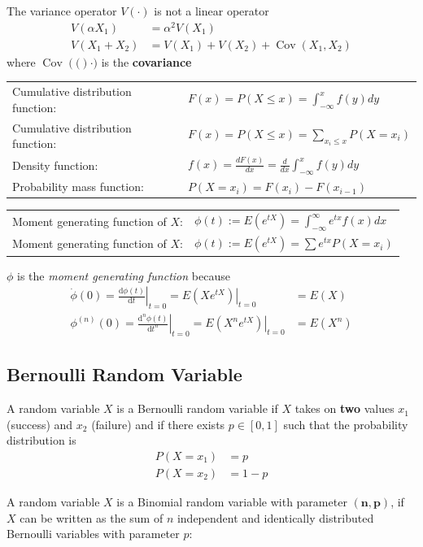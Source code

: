 \documentclass[11pt]{article}
\theoremstyle{definition}
\newcommand*\Cov[1]{\mathop{\text{Cov}}\left(#1\right)}
\begin{document}
The variance operator $V(\cdot)$ is not a linear operator
\begin{align*}
	V(\alpha X_1) &= \alpha^2 V(X_1)\\
	V(X_1 + X_2) &= V(X_1) + V(X_2) + \Cov{X_1,X_2}
\end{align*}
where $\Cov(\cdot)$ is the \textbf{covariance}

\begin{tabularx}{\linewidth}{lX}
	Cumulative distribution function: & $ F(x) = P(X\leq x) = \int_{-\infty}^{x}f(y)dy$\\
	Cumulative distribution function: & $ F(x) = P(X\leq x) = \sum_{x_i \leq x} P(X=x_i)$\\
	Density function: & $ f(x) = \frac{dF(x)}{dx} = \frac{d}{dx}\int_{-\infty}^{x}f(y)dy$\\
	Probability mass function: & $ P(X = x_i) = F(x_i) - F(x_{i-1})$\\
\end{tabularx}

\begin{tabularx}{\linewidth}{lX}
	Moment generating function of $X$: & $ \phi(t) := E(e^{tX}) = \int_{-\infty}^{\infty} e^{tx}f(x) dx$\\
	Moment generating function of $X$: & $ \phi(t) := E(e^{tX}) = \sum e^{tx}P(X=x_i)$
\end{tabularx}

$\phi$ is the \emph{moment generating function} because
\begin{align*}
	\dot{\phi}(0) = \left.\frac{\text{d}\phi(t)}{\text{d}t}\right|_{t=0} = \left. E(X e^{tX})\right|_{t=0} &= E(X)\\
	\phi^{(n)}(0) = \left.\frac{\text{d}^n\phi(t)}{\text{d}t^n}\right|_{t=0} = \left. E(X^n e^{tX})\right|_{t=0} &= E(X^n)
\end{align*}

\subsection{Bernoulli Random Variable}
A random variable $X$ is a Bernoulli random variable if $X$ takes on \textbf{two} values $x_1$ (success) and $x_2$ (failure) and if there exists $p\in[0,1]$ such that the probability distribution is
\begin{align*}
	P(X=x_1) &= p\\
	P(X=x_2) &= 1-p
\end{align*}

A random variable $X$ is a Binomial random variable with parameter $(\textbf{n}, \textbf{p})$, if $X$ can be written as the sum of $n$ independent and identically distributed Bernoulli variables with parameter $p$:
\end{document}
